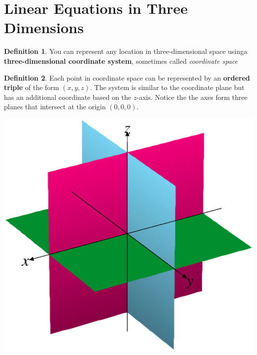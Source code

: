 \documentclass{report}
\theoremstyle{definition}
\newtheorem{definition}{\bf Definition}[section]
\begin{document}
 \section{    Linear Equations in Three Dimensions   }
 \setcounter{example}{0}
 \setcounter{definition}{0}

\vspace{-1cm}

\begin{minipage}{0.45\linewidth}
 \begin{definition}
 You can represent any location in three-dimensional space using\newline a \textbf{three-dimensional coordinate system}, sometimes called \emph{coordinate space}
 \end{definition}
\vspace{0.25cm}
\begin{definition}
Each point in coordinate space can be represented by an \textbf{ordered triple} of the form $(x,y,z)$. The system is similar to the coordinate plane but has an additional coordinate based on the $z$-axis. Notice the the axes form three planes that intersect at the origin $(0,0,0)$.
\end{definition}
\end{minipage}
\hfill
\begin{minipage}{0.45\linewidth}
\begin{flushright}
	\includegraphics[scale=0.45]{3space.eps}
\end{flushright}
\end{minipage}
\end{document}
